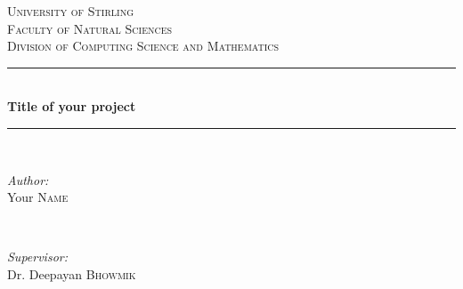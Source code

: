 %
%
%
	\begin{titlepage}
		
		\newcommand{\HRule}{\rule{\linewidth}{0.5mm}} %
		
		\center %
		
		
		\textsc{\LARGE University of Stirling}\\[1.5cm] %
		\textsc{\Large Faculty of Natural Sciences}\\[0.5cm] %
		\textsc{\large Division of Computing Science and Mathematics}\\[3.5cm] 
		
		
		\HRule \\[0.4cm]
		{ \huge \bfseries Title of your project}\\[1cm] %
		\HRule \\[1.5cm]
		
		
		\begin{minipage}{0.4\textwidth}
			\begin{flushleft} \large
				\emph{Author:}\\
				Your \textsc{Name} %
			\end{flushleft}
		\end{minipage}
		~
		\begin{minipage}{0.4\textwidth}
			\begin{flushright} \large
				\emph{Supervisor:} \\
				Dr. Deepayan \textsc{Bhowmik} %
			\end{flushright}
		\end{minipage}\\[4cm]
		

\end{titlepage}
